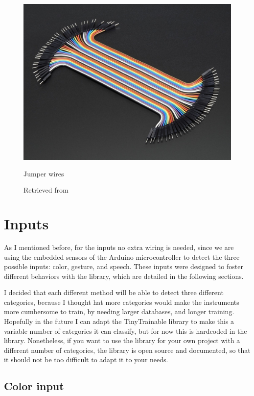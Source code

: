 \begin{figure}[ht]
  \centering
  \includegraphics[width=0.75\linewidth,height=0.25\textheight,keepaspectratio]{images/materials-adafruit-jumper-wires.jpg}
  \caption{Jumper wires}
  \caption*{Retrieved from \cite{website-materials-adafruit-jumper-wires}}
  \label{fig:materials-adafruit-jumper-wires}
\end{figure}

\section{Inputs}

As I mentioned before, for the inputs no extra wiring is needed, since we are using the embedded sensors of the Arduino microcontroller to detect the three possible inputs: color, gesture, and speech. These inputs were designed to foster different behaviors with the library, which are detailed in the following sections.

I decided that each different method will be able to detect three different categories, because I thought hat more categories would make the instruments more cumbersome to train, by needing larger databases, and longer training. Hopefully in the future I can adapt the TinyTrainable library to make this a variable number of categories it can classify, but for now this is hardcoded in the library. Nonetheless, if you want to use the library for your own project with a different number of categories, the library is open source and documented, so that it should not be too difficult to adapt it to your needs.

\subsection{Color input}

